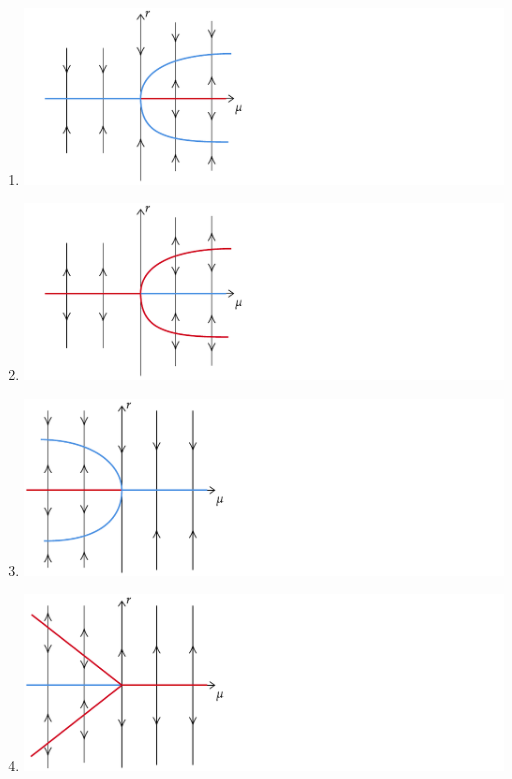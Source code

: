 \documentclass[twoside,10pt,a4paper]{article}
\begin{document}
\begin{enumerate}[label=(\alph*)]
	\item \includegraphics[scale=0.8]{Graphics/MCQ1_figures/Q14D01.pdf}
	\newpage
	\item \includegraphics[scale=0.8]{Graphics/MCQ1_figures/Q14D02.pdf}
	\item \includegraphics[scale=0.8]{Graphics/MCQ1_figures/Q14D03.pdf}
	\item \includegraphics[scale=0.8]{Graphics/MCQ1_figures/Q14D04.pdf}
\end{enumerate}
\end{document}
